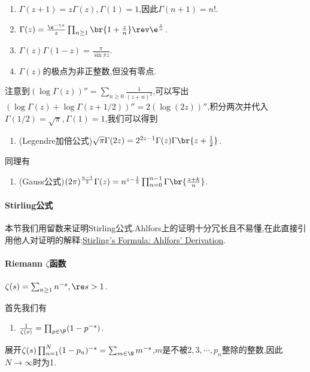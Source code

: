 \documentclass{article}
\begin{document}
\begin{enumerate}
    \item $\Gamma(z+1)=z\Gamma(z),\Gamma(1)=1$,因此$\Gamma(n+1)=n!$.
    \item $\Gamma(z)=\frac{\e^{-\gamma z}}{z}\prod_{n\geq 1}\br{1+\frac{z}{n}}\rev\e^{\frac{z}{n}}$.
    \item $\Gamma(z)\Gamma(1-z)=\frac{\pi}{\sin \pi z}$.
    \item $\Gamma(z)$的极点为非正整数,但没有零点.
\end{enumerate}

注意到$(\log \Gamma(z))''=\sum_{n\geq 0}\frac{1}{(z+n)^2}$,可以写出$(\log \Gamma(z)+\log\Gamma(z+1/2))''=2(\log(2z))''$,积分两次并代入$\Gamma(1/2)=\sqrt{\pi},\Gamma(1)=1$,我们可以得到
\begin{enumerate}[resume]
    \item (Legendre加倍公式)$\sqrt{\pi}\Gamma(2z)=2^{2z-1}\Gamma(z)\Gamma\br{z+\frac{1}{2}}$.
\end{enumerate}
同理有
\begin{enumerate}[resume]
    \item (Gauss公式)$(2\pi)^{\frac{n-1}{2}}\Gamma(z)=n^{z-\frac{1}{2}}\prod_{n=0}^{n-1}\Gamma\br{\frac{z+k}{n}}$.
\end{enumerate}

\paragraph{Stirling公式}本节我们用留数来证明Stirling公式.Ahlfors上的证明十分冗长且不易懂,在此直接引用他人对证明的解释:\href{https://michaelcweiss.files.wordpress.com/2019/07/stirling-ahlfors.pdf}{Stirling's Formula: Ahlfors' Derivation}.

\paragraph{Riemann $\zeta$函数}$\zeta(s)=\sum_{n\geq 1}n^{-s}, \re s>1$.

首先我们有
\begin{enumerate}
    \item $\frac{1}{\zeta(s)}=\prod_{p\in\P}(1-p^{-s})$.
\end{enumerate}
展开$\zeta(s)\prod_{n=1}^N(1-p_n)^{-s}=\sum_{m\in\N}m^{-s}$,$m$是不被$2,3,\cdots,p_n$整除的整数,因此$N\to\infty$时为1.
\end{document}
